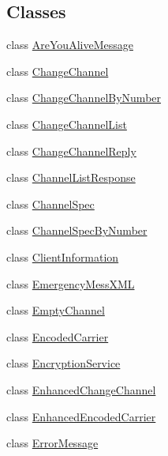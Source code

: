 \subsection*{Classes}
\begin{DoxyCompactItemize}
\item 
class \hyperlink{classgov_1_1fnal_1_1ppd_1_1dd_1_1xml_1_1AreYouAliveMessage}{Are\-You\-Alive\-Message}
\item 
class \hyperlink{classgov_1_1fnal_1_1ppd_1_1dd_1_1xml_1_1ChangeChannel}{Change\-Channel}
\item 
class \hyperlink{classgov_1_1fnal_1_1ppd_1_1dd_1_1xml_1_1ChangeChannelByNumber}{Change\-Channel\-By\-Number}
\item 
class \hyperlink{classgov_1_1fnal_1_1ppd_1_1dd_1_1xml_1_1ChangeChannelList}{Change\-Channel\-List}
\item 
class \hyperlink{classgov_1_1fnal_1_1ppd_1_1dd_1_1xml_1_1ChangeChannelReply}{Change\-Channel\-Reply}
\item 
class \hyperlink{classgov_1_1fnal_1_1ppd_1_1dd_1_1xml_1_1ChannelListResponse}{Channel\-List\-Response}
\item 
class \hyperlink{classgov_1_1fnal_1_1ppd_1_1dd_1_1xml_1_1ChannelSpec}{Channel\-Spec}
\item 
class \hyperlink{classgov_1_1fnal_1_1ppd_1_1dd_1_1xml_1_1ChannelSpecByNumber}{Channel\-Spec\-By\-Number}
\item 
class \hyperlink{classgov_1_1fnal_1_1ppd_1_1dd_1_1xml_1_1ClientInformation}{Client\-Information}
\item 
class \hyperlink{classgov_1_1fnal_1_1ppd_1_1dd_1_1xml_1_1EmergencyMessXML}{Emergency\-Mess\-X\-M\-L}
\item 
class \hyperlink{classgov_1_1fnal_1_1ppd_1_1dd_1_1xml_1_1EmptyChannel}{Empty\-Channel}
\item 
class \hyperlink{classgov_1_1fnal_1_1ppd_1_1dd_1_1xml_1_1EncodedCarrier}{Encoded\-Carrier}
\item 
class \hyperlink{classgov_1_1fnal_1_1ppd_1_1dd_1_1xml_1_1EncryptionService}{Encryption\-Service}
\item 
class \hyperlink{classgov_1_1fnal_1_1ppd_1_1dd_1_1xml_1_1EnhancedChangeChannel}{Enhanced\-Change\-Channel}
\item 
class \hyperlink{classgov_1_1fnal_1_1ppd_1_1dd_1_1xml_1_1EnhancedEncodedCarrier}{Enhanced\-Encoded\-Carrier}
\item 
class \hyperlink{classgov_1_1fnal_1_1ppd_1_1dd_1_1xml_1_1ErrorMessage}{Error\-Message}
\item 

\end{DoxyCompactItemize}
